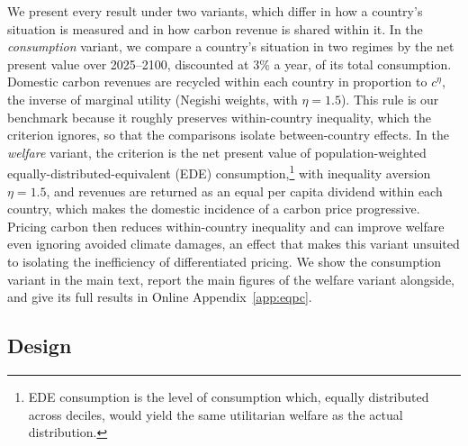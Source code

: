 \documentclass[12pt,english]{article}
\theoremstyle{remark}
\begin{document}
We present every result under two variants, which differ in how a country's situation is measured and in how carbon revenue is shared within it. 
In the \emph{consumption} variant, we compare a country's situation in two regimes by the net present value over 2025--2100, discounted at 3\% a year, of its total consumption. %
Domestic carbon revenues are recycled within each country in proportion to $c^{\eta}$, the inverse of marginal utility (Negishi weights, with $\eta=1.5$). This rule is our benchmark because it roughly preserves within-country inequality, which the criterion ignores, so that the comparisons isolate between-country effects.
In the \emph{welfare} variant, the criterion is the net present value of population-weighted equally-distributed-equivalent (EDE) consumption,\footnote{EDE consumption is the level of consumption which, equally distributed across deciles, would yield the same utilitarian welfare as the actual distribution.} with inequality aversion $\eta=1.5$, and revenues are returned as an equal per capita dividend within each country, which makes the domestic incidence of a carbon price progressive. Pricing carbon then reduces within-country inequality and can improve welfare even ignoring avoided climate damages, an effect that makes this variant unsuited to isolating the inefficiency of differentiated pricing. %
We show the consumption variant in the main text, report the main figures of the welfare variant alongside, and give its full results in Online Appendix~\ref{app:eqpc}. 

\subsection{Design}

\end{document}
